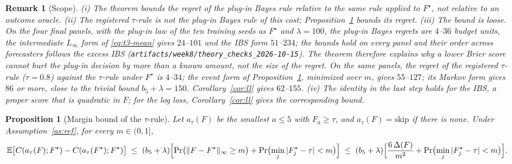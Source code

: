 \documentclass[10pt]{article}
\newtheorem{proposition}{Proposition}
\newtheorem{remark}{Remark}
\begin{document}
\begin{remark}[Scope]
(i) The theorem bounds the regret of the plug-in Bayes rule relative to the same rule applied to $F^\star$, not relative to an outcome oracle. (ii) The registered $\tau$-rule is not the plug-in Bayes rule of this cost; Proposition~\ref{prop:tau} bounds its regret. (iii) The bound is loose. On the four final panels, with the plug-in law of the ten training seeds as $F^\star$ and $\lambda=100$, the plug-in Bayes regrets are $4$--$36$ budget units, the intermediate $L_\infty$ form of \eqref{eq:t3-mean} gives $24$--$101$ and the IBS form $51$--$234$; the bounds hold on every panel and their order across forecasters follows the excess IBS (\texttt{artifacts/week8/theory\_checks\_2026-10-15}). The theorem therefore explains why a lower Brier score cannot hurt the plug-in decision by more than a known amount, not the size of the regret. On the same panels, the regret of the registered $\tau$-rule ($\tau=0.8$) against the $\tau$-rule under $F^\star$ is $4$--$34$; the event form of Proposition~\ref{prop:tau}, minimized over $m$, gives $55$--$127$; its Markov form gives $86$ or more, close to the trivial bound $b_5+\lambda=150$. Corollary~\ref{cor:ll} gives $62$--$155$. (iv) The identity in the last step holds for the IBS, a proper score that is quadratic in $F$; for the log loss, Corollary~\ref{cor:ll} gives the corresponding bound.
\end{remark}

\begin{proposition}[Margin bound of the $\tau$-rule]\label{prop:tau}
Let $a_\tau(F)$ be the smallest $a\le5$ with $F_a\ge\tau$, and $a_\tau(F)=\mathrm{skip}$ if there is none. Under Assumption~\ref{as:ref}, for every $m\in(0,1]$,
\begin{equation}
\mathbb E\bigl[C(a_\tau(F);F^\star)-C(a_\tau(F^\star);F^\star)\bigr]\;\le\;(b_5+\lambda)\Bigl[\Pr\bigl(\|F-F^\star\|_\infty\ge m\bigr)+\Pr\bigl(\min_j|F^\star_j-\tau|<m\bigr)\Bigr]
\;\le\;(b_5+\lambda)\Bigl[\frac{6\,\Delta(F)}{m^2}+\Pr\bigl(\min_j|F^\star_j-\tau|<m\bigr)\Bigr].
\label{eq:tau}
\end{equation}
\end{proposition}
\end{document}
